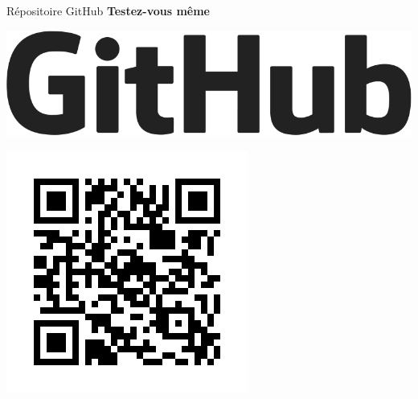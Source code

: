 \documentclass{beamer}
\begin{document}
\begin{frame}{Répositoire GitHub}
\centering
\vspace{1em}
{\Huge \textbf{Testez-vous même}}

\vspace{2em}

\begin{minipage}{0.45\textwidth}
    \centering
    \includegraphics[width=\linewidth]{GitHub-Logo-ee398b662d42.png} 
\end{minipage}
\hfill
\begin{minipage}{0.45\textwidth}
    \centering
    \includegraphics[width=\linewidth]{qr-code.png} 
\end{minipage}

\end{frame}
\end{document}
